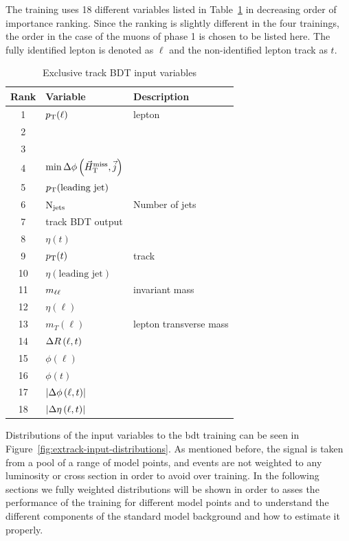 The training uses 18 different variables listed in Table~\ref{tab:extrack-bdt-variables} in decreasing order of importance ranking. Since the ranking is slightly different in the four trainings, the order in the case of the muons of phase 1 is chosen to be listed here. The fully identified lepton is denoted as $\ell$ and the non-identified lepton track as $t$.

\begin{table}[!htb]
	\centering
	\label{tab:extrack-bdt-variables}
		\caption{Exclusive track BDT input variables}
			\begin{tabular}{cll} \hline
			Rank & Variable & Description \\ \hline
			1 & $p_{\mathrm{T}}(\ell)$ & lepton \pt\\
			2 & \HT & \\
			3 & \mht & \\
			4 & $\min{\Delta\phi\left(\ensuremath{\vec{H}_{\text{T}}^{\text{miss}}},\vec{j}\right)}$ & \\
			5 & $p_{\mathrm{T}}(\text{leading jet})$ & \\
			6 & $\mathrm{N}_{\mathrm{jets}}$ & Number of jets \\					7 & track BDT output & \\
			8 & $\eta(t)$ & \\
			9 & $p_{\mathrm{T}}(t)$ & track \pt\\
			10 & $\eta(\text{leading jet})$ & \\				11 & $m_{\ell\ell}$ & invariant mass \\
			12 & $\eta(\ell)$ & \\
			13 & $m_T(\ell)$ & lepton transverse mass\\			
			14 & $\Delta R\left(\ell, t\right)$ & \\
			15 & $\phi(\ell)$ & \\
			16 & $\phi(t)$ & \\
			17 & $\lvert \Delta\phi\left(\ell,t \right) \rvert$ & \\			
			18 & $\lvert \Delta \eta \left(\ell, t\right)  \rvert$ & \\			
			\hline
			\end{tabular}
\end{table}

Distributions of the input variables to the \gls{bdt} training can be seen in Figure~\ref{fig:extrack-input-distributions}. As mentioned before, the signal is taken from a pool of a range of model points, and events are not weighted to any luminosity or cross section in order to avoid over training. In the following sections we fully weighted distributions will be shown in order to asses the performance of the training for different model points and to understand the different components of the standard model background and how to estimate it properly.

